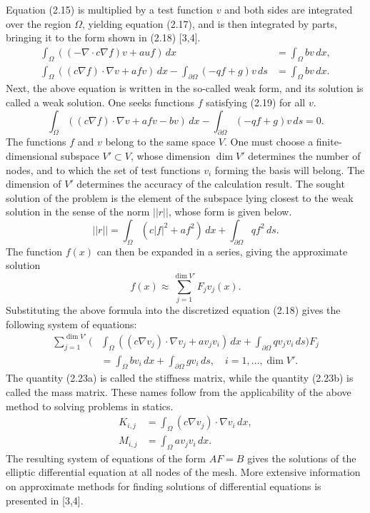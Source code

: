 \documentclass[12pt,a4paper]{article}
\begin{document}
Equation (2.15) is multiplied by a test function $v$ and both sides are integrated over the region
$\Omega$, yielding equation (2.17), and is then integrated by parts, bringing it to the form shown
in (2.18) [3,4].
\begin{align}
\int_\Omega\left((-\nabla\cdot c\nabla f)v+auf\right)\,dx &= \int_\Omega bv\,dx, \tag{2.17}\\
\int_\Omega\left((c\nabla f)\cdot\nabla v+afv\right)\,dx-\int_{\partial\Omega}(-qf+g)v\,ds &= \int_\Omega bv\,dx. \tag{2.18}
\end{align}
Next, the above equation is written in the so-called weak form, and its solution is called a weak
solution. One seeks functions $f$ satisfying (2.19) for all $v$.
\begin{equation}
\int_\Omega\left((c\nabla f)\cdot\nabla v+afv-bv\right)\,dx-\int_{\partial\Omega}(-qf+g)v\,ds=0. \tag{2.19}
\end{equation}
The functions $f$ and $v$ belong to the same space $V$. One must choose a finite-dimensional
subspace $V'\subset V$, whose dimension $\dim V'$ determines the number of nodes, and to which
the set of test functions $v_i$ forming the basis will belong. The dimension of $V'$ determines the
accuracy of the calculation result. The sought solution of the problem is the element of the subspace
lying closest to the weak solution in the sense of the norm $||r||$, whose form is given below.
\begin{equation}
||r||=\int_\Omega(c|f|^2+af^2)\,dx+\int_{\partial\Omega}qf^2\,ds. \tag{2.20}
\end{equation}
The function $f(x)$ can then be expanded in a series, giving the approximate solution
\begin{equation}
f(x)\approx\sum_{j=1}^{\dim V'}F_jv_j(x). \tag{2.21}
\end{equation}
Substituting the above formula into the discretized equation (2.18) gives the following system of
equations:
\begin{equation}
\begin{aligned}
\sum_{j=1}^{\dim V'}\bigg(&\int_\Omega\left((c\nabla v_j)\cdot\nabla v_j+av_jv_i\right)\,dx
+\int_{\partial\Omega}qv_jv_i\,ds\bigg)F_j \\
&=\int_\Omega bv_i\,dx+\int_{\partial\Omega}gv_i\,ds,\quad i=1,\ldots,\dim V'.
\end{aligned}
\tag{2.22}
\end{equation}
The quantity (2.23a) is called the stiffness matrix, while the quantity (2.23b) is called the mass
matrix. These names follow from the applicability of the above method to solving problems in statics.
\begin{align}
K_{i,j} &= \int_\Omega(c\nabla v_j)\cdot\nabla v_i\,dx, \tag{2.23a}\\
M_{i,j} &= \int_\Omega av_jv_i\,dx. \tag{2.23b}
\end{align}
The resulting system of equations of the form $AF=B$ gives the solutions of the elliptic differential
equation at all nodes of the mesh. More extensive information on approximate methods for finding
solutions of differential equations is presented in [3,4].
\end{document}
